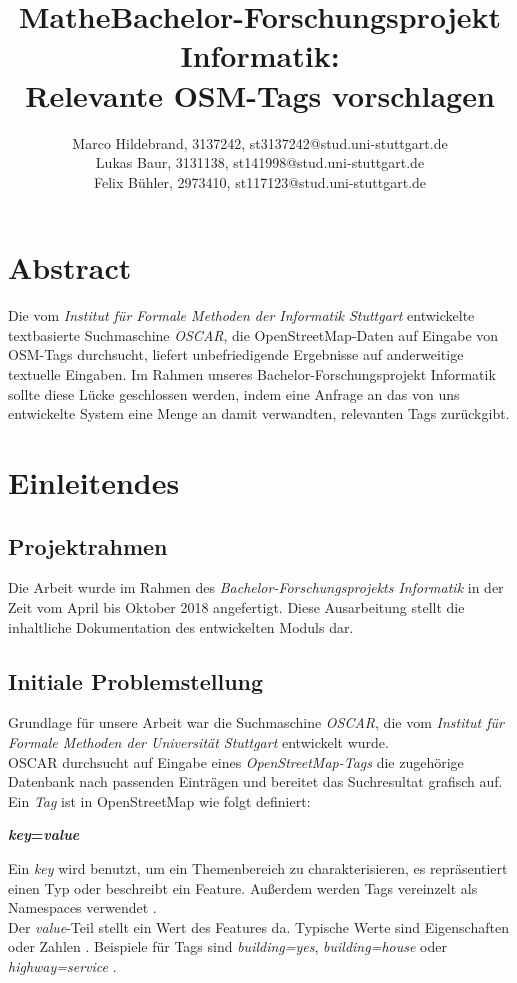 \documentclass[12pt,pdftex,a4paper]{article}
\title{Mathe}
\begin{document}
\title{Bachelor-Forschungsprojekt Informatik:\\Relevante OSM-Tags vorschlagen}
\author{Marco Hildebrand, 3137242, st3137242@stud.uni-stuttgart.de\\
		Lukas Baur, 3131138, st141998@stud.uni-stuttgart.de\\
		Felix Bühler, 2973410, st117123@stud.uni-stuttgart.de}
\maketitle


\section*{Abstract}
Die vom \textit{Institut für Formale Methoden der Informatik Stuttgart} entwickelte textbasierte Suchmaschine \textit{OSCAR}, die OpenStreetMap-Daten auf Eingabe von OSM-Tags durchsucht, liefert unbefriedigende Ergebnisse auf anderweitige textuelle Eingaben. 
Im Rahmen unseres Bachelor-Forschungsprojekt Informatik sollte diese Lücke geschlossen werden, indem eine Anfrage an das von uns entwickelte System eine Menge an damit verwandten, relevanten Tags zurückgibt.

\pagebreak
\section{Einleitendes}
\subsection{Projektrahmen}
Die Arbeit wurde im Rahmen des \textit{Bachelor-Forschungsprojekts Informatik} in der Zeit vom April bis Oktober 2018 angefertigt. Diese Ausarbeitung stellt die inhaltliche Dokumentation des entwickelten Moduls dar.
\subsection{Initiale Problemstellung}
Grundlage für unsere Arbeit war die Suchmaschine \textit{OSCAR}, die vom \textit{Institut für Formale Methoden der Universität Stuttgart} entwickelt wurde.\\
OSCAR durchsucht auf Eingabe eines \textit{OpenStreetMap-Tags} die  zugehörige Datenbank nach passenden Einträgen und bereitet das Suchresultat grafisch auf. Ein \textit{Tag} ist in OpenStreetMap wie folgt definiert:
\begin{center}
	\textbf{\textit{key}=\textit{value}}
\end{center}
Ein \textit{key} wird benutzt, um ein Themenbereich zu charakterisieren, es repräsentiert einen Typ oder beschreibt ein Feature. Außerdem werden Tags vereinzelt als Namespaces verwendet \cite{keyDescription}.\\
Der \textit{value}-Teil stellt ein Wert des Features da. Typische Werte sind Eigenschaften oder Zahlen \cite{keyDescription}.
Beispiele für Tags sind \textit{building=yes}, \textit{building=house} oder  \textit{highway=service} \cite{example1}\cite{example2}.\\
\end{document}
